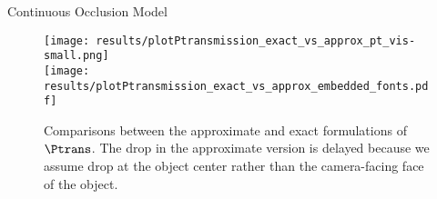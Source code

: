 \documentclass[handout,final]{beamer}
\newlength{\onecolwid}
\begin{document}
\begin{frame}[t]
\begin{columns}[t]
\begin{column}{\onecolwid}
\begin{block}{Continuous Occlusion Model}
        \begin{figure}
          \centering
          \texttt{[image: results/plotPtransmission\_exact\_vs\_approx\_pt\_vis-small.png]}\\
          \texttt{[image: results/plotPtransmission\_exact\_vs\_approx\_embedded\_fonts.pdf]}
          \vspace{-0.3cm}
          \caption{\small Comparisons between the approximate and exact formulations of $\Ptrans$. The drop in the approximate version is delayed because we assume drop at the object center rather than the camera-facing face of the object.}
          \label{fig:compare:exact:approx:ptrans}
          \vspace{-0.3cm}
        \end{figure}
      \end{block}


\end{column}
\end{columns}
\end{frame}
\end{document}
